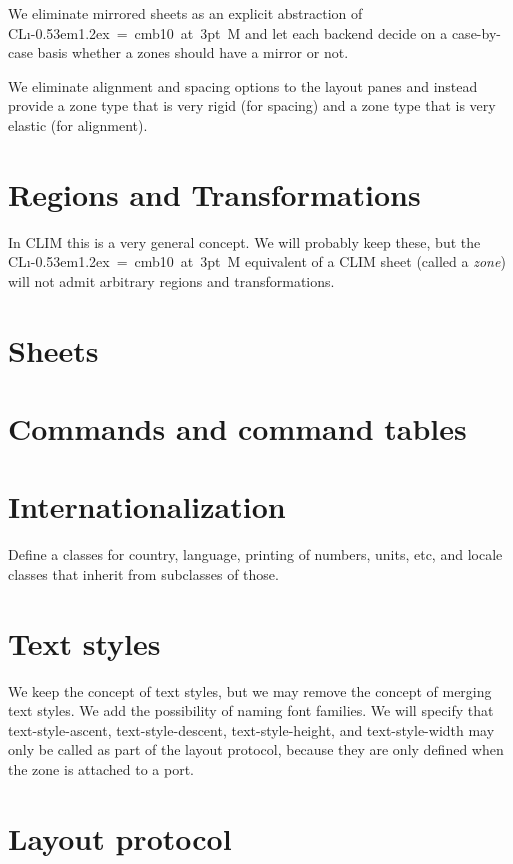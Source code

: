 \documentclass{report}
\def\Tiny{ \font\Tinyfont = cmb10 at 3pt \relax  \Tinyfont}
\def\clim{\textsf{CL{\i}\kern-0.53em\raise1.2ex\hbox{\Tiny 3}M}}
\def\climtwo{CLIM\thinspace{\small II}}
\begin{document}
We eliminate mirrored sheets as an explicit abstraction of \clim{} and
let each backend decide on a case-by-case basis whether a zones should
have a mirror or not.

We eliminate alignment and spacing options to the layout panes and
instead provide a zone type that is very rigid (for spacing) and a
zone type that is very elastic (for alignment).

\section{Regions and Transformations}

In \climtwo{} this is a very general concept.  We will probably keep
these, but the \clim{} equivalent of a \climtwo{} sheet (called a
\emph{zone}) will not admit arbitrary regions and transformations. 

\section{Sheets}

\section{Commands and command tables}

\section{Internationalization}

Define a classes for country, language, printing of numbers, units,
etc, and locale classes that inherit from subclasses of those.

\section{Text styles}

We keep the concept of text styles, but we may remove the concept of
merging text styles.  We add the possibility of naming font families. 
We will specify that text-style-ascent, text-style-descent,
text-style-height, and text-style-width may only be called as part of
the layout protocol, because they are only defined when the zone is
attached to a port. 

\section{Layout protocol}
\end{document}
